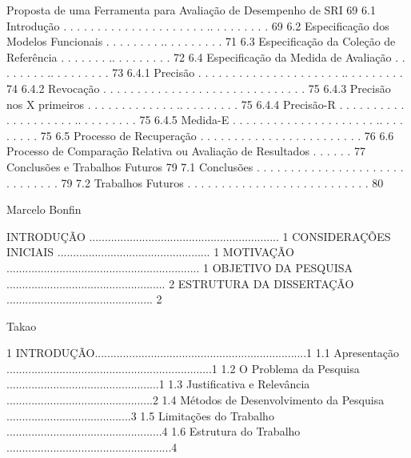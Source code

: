 Proposta de uma Ferramenta para Avaliação de Desempenho de SRI 69
6.1 Introdução . . . . . . . . . . . . . . . . . . . . . .. . . . . . . . . 69
6.2 Especificação dos Modelos Funcionais . . . . . . . . .. . . . . . . . . 71
6.3 Especificação da Coleção de Referência . . . . . . . .. . . . . . . . . 72
6.4 Especificação da Medida de Avaliação . . . . . . . . .. . . . . . . . . 73
6.4.1 Precisão . . . . . . . . . . . . . . . . . . . . . .. . . . . . . . . 74
6.4.2 Revocação . . . . . . . . . . . . . . . . . . . . . . . . . . . . . . 75
6.4.3 Precisão nos X primeiros . . . . . . . . . . . . . .. . . . . . . . . 75
6.4.4 Precisão-R . . . . . . . . . . . . . . . . . . . . .. . . . . . . . . 75
6.4.5 Medida-E . . . . . . . . . . . . . . . . . . . . . .. . . . . . . . . 75
6.5 Processo de Recuperação . . . . . . . . . . . . . . . . . . . . . . . . 76
6.6 Processo de Comparação Relativa ou Avaliação de Resultados  . . . . . . 77
Conclusões e Trabalhos Futuros 79
7.1 Conclusões . . . . . . . . . . . . . . . . . . . . . . . .  . . . . . . 79
7.2 Trabalhos Futuros . . . . . . . . . . . . . . . . . . . . . . . . . . . 80




Marcelo Bonfin

INTRODUÇÃO ............................................................. 1
CONSIDERAÇÕES INICIAIS ................................................. 1
MOTIVAÇÃO .............................................................. 1
OBJETIVO DA PESQUISA ................................................... 2
ESTRUTURA DA DISSERTAÇÃO ............................................... 2





Takao

1 INTRODUÇÃO....................................................................1
1.1 Apresentação ..................................................................1
1.2 O Problema da Pesquisa .................................................1
1.3 Justificativa e Relevância ...............................................2
1.4 Métodos de Desenvolvimento da Pesquisa ........................................3
1.5 Limitações do Trabalho ..................................................4
1.6 Estrutura do Trabalho .....................................................4







